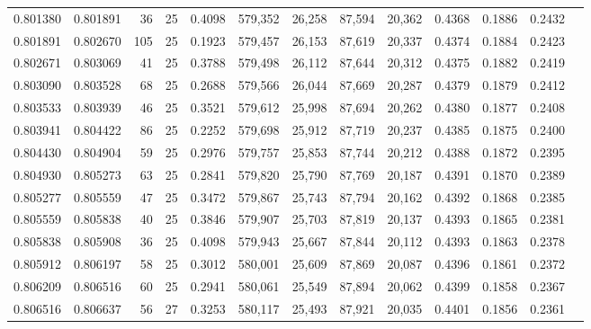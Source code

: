 \begin{tabular}{rrrrrrrrrrrrr}
0.801380 & 0.801891 &    36 &  25 &                                     0.4098 & 579,352 &  26,258 &  87,594 &  20,362 & 0.4368 & 0.1886 & 0.2432 \\
0.801891 & 0.802670 &   105 &  25 &                                     0.1923 & 579,457 &  26,153 &  87,619 &  20,337 & 0.4374 & 0.1884 & 0.2423 \\
0.802671 & 0.803069 &    41 &  25 &                                     0.3788 & 579,498 &  26,112 &  87,644 &  20,312 & 0.4375 & 0.1882 & 0.2419 \\
0.803090 & 0.803528 &    68 &  25 &                                     0.2688 & 579,566 &  26,044 &  87,669 &  20,287 & 0.4379 & 0.1879 & 0.2412 \\
0.803533 & 0.803939 &    46 &  25 &                                     0.3521 & 579,612 &  25,998 &  87,694 &  20,262 & 0.4380 & 0.1877 & 0.2408 \\
0.803941 & 0.804422 &    86 &  25 &                                     0.2252 & 579,698 &  25,912 &  87,719 &  20,237 & 0.4385 & 0.1875 & 0.2400 \\
0.804430 & 0.804904 &    59 &  25 &                                     0.2976 & 579,757 &  25,853 &  87,744 &  20,212 & 0.4388 & 0.1872 & 0.2395 \\
0.804930 & 0.805273 &    63 &  25 &                                     0.2841 & 579,820 &  25,790 &  87,769 &  20,187 & 0.4391 & 0.1870 & 0.2389 \\
0.805277 & 0.805559 &    47 &  25 &                                     0.3472 & 579,867 &  25,743 &  87,794 &  20,162 & 0.4392 & 0.1868 & 0.2385 \\
0.805559 & 0.805838 &    40 &  25 &                                     0.3846 & 579,907 &  25,703 &  87,819 &  20,137 & 0.4393 & 0.1865 & 0.2381 \\
0.805838 & 0.805908 &    36 &  25 &                                     0.4098 & 579,943 &  25,667 &  87,844 &  20,112 & 0.4393 & 0.1863 & 0.2378 \\
0.805912 & 0.806197 &    58 &  25 &                                     0.3012 & 580,001 &  25,609 &  87,869 &  20,087 & 0.4396 & 0.1861 & 0.2372 \\
0.806209 & 0.806516 &    60 &  25 &                                     0.2941 & 580,061 &  25,549 &  87,894 &  20,062 & 0.4399 & 0.1858 & 0.2367 \\
0.806516 & 0.806637 &    56 &  27 &                                     0.3253 & 580,117 &  25,493 &  87,921 &  20,035 & 0.4401 & 0.1856 & 0.2361 \\

\end{tabular}
